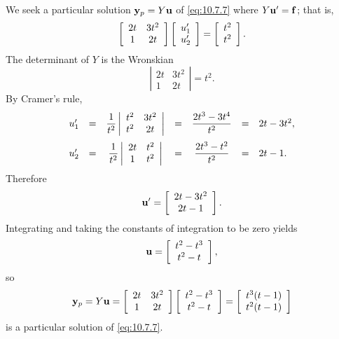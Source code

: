 \begin{examplesolution}
\solution We seek a particular solution ${\bf y}_{p}=Y{\bf u}$ of \eqref{eq:10.7.7} where
$Y{\bf u}'={\bf f}$; that is,
\[
  \left[
  \begin{array}{cc}
    2t & 3t^{2} \\
    1  & 2t
  \end{array}\right]\left[\begin{array}{l}u_{1}'\\u_{2}'\end{array}\right]=\left[\begin{array}{l}t^{2}\\t^{2}\end{array}\right].
\]
The determinant of $Y$ is the Wronskian
\[
  \left|
  \begin{array}{cc}
    2t & 3t^{2} \\
    1  & 2t
  \end{array}\right|=t^{2}.
\]
By Cramer's rule,
\[
  \begin{array}{ccccccl}
    u_{1}' & = & \displaystyle\frac{1}{t^{2}}\left|\begin{array}{cc}t^{2}&3t^{2}\\t^{2}&2t\end{array}\right| & = & \displaystyle\frac{2t^{3}-3t^{4}}{t^{2}} & = & 2t-3t^{2}, \\[4\jot]
    u_{2}' & = & \displaystyle\frac{1}{t^{2}}\left|\begin{array}{cc}2t&t^{2}\\1&t^{2}\end{array}\right|      & = & \displaystyle\frac{2t^{3}-t^{2}}{t^{2}}  & = & 2t-1.
  \end{array}
\]
Therefore
\[
  {\bf u}'=\left[
  \begin{array}{c}
    2t-3t^{2} \\
    2t-1
  \end{array}\right].
\]
Integrating and taking the constants of integration to be zero yields
\[
  {\bf u}=\left[
  \begin{array}{c}
    t^{2}-t^{3} \\
    t^{2}-t
  \end{array}\right],
\]
so
\[
  {\bf y}_{p}=Y{\bf u}= \left[
  \begin{array}{cc}
    2t & 3t^{2} \\
    1  & 2t
  \end{array}\right] \left[
  \begin{array}{c}
    t^{2}-t^{3} \\
    t^{2}-t
  \end{array}\right] =\left[
  \begin{array}{c}
    t^{3}(t-1) \\
    t^{2}(t-1)
  \end{array}\right]
\]
is a particular solution of \eqref{eq:10.7.7}.
\end{examplesolution}


